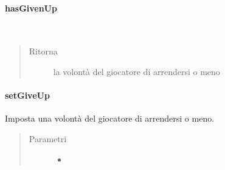 \documentclass[letterpaper,10pt,italian,openany,oneside]{sphinxmanual}
\begin{document}
\paragraph{hasGivenUp}
\label{\detokenize{source/it/unicam/cs/pa/mastermind/players/CodeBreaker:hasgivenup}}

\begin{fulllineitems}
\label{\detokenize{source/it/unicam/cs/pa/mastermind/players/CodeBreaker:it.unicam.cs.pa.mastermind.players.CodeBreaker.hasGivenUp()}}~\begin{quote}\begin{description}
\item[{Ritorna}] \leavevmode
la volontà del giocatore  di arrendersi o meno

\end{description}\end{quote}

\end{fulllineitems}



\paragraph{setGiveUp}
\label{\detokenize{source/it/unicam/cs/pa/mastermind/players/CodeBreaker:setgiveup}}

\begin{fulllineitems}
\label{\detokenize{source/it/unicam/cs/pa/mastermind/players/CodeBreaker:it.unicam.cs.pa.mastermind.players.CodeBreaker.setGiveUp(boolean)}}
Imposta una volontà del giocatore di arrendersi o meno.
\begin{quote}\begin{description}
\item[{Parametri}] \leavevmode\begin{itemize}
\item {} 
 \textendash{} 

\end{itemize}

\end{description}\end{quote}

\end{fulllineitems}
\end{document}
